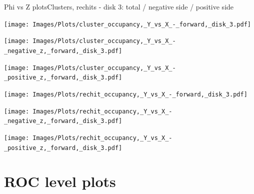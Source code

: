 \documentclass{beamer}
\begin{document}
\begin{frame}{Phi vs Z plots}{Clusters, rechits - disk 3: total / negative side / positive side}
  \hspace{0.01\textwidth}%
  \begin{minipage}{0.32\textwidth}
    \centering
    \texttt{[image: Images/Plots/cluster\_occupancy,\_Y\_vs\_X\_-\_forward,\_disk\_3.pdf]}
  \end{minipage}%
  \hspace{0.01\textwidth}%
  \begin{minipage}{0.32\textwidth}
    \centering
    \texttt{[image: Images/Plots/cluster\_occupancy,\_Y\_vs\_X\_-\_negative\_z,\_forward,\_disk\_3.pdf]}
  \end{minipage}
  \vspace*{0.2cm}
  \begin{minipage}{0.32\textwidth}
    \centering
    \texttt{[image: Images/Plots/cluster\_occupancy,\_Y\_vs\_X\_-\_positive\_z,\_forward,\_disk\_3.pdf]}
  \end{minipage}
  \hspace{0.01\textwidth}%
  \begin{minipage}{0.32\textwidth}
    \centering
    \texttt{[image: Images/Plots/rechit\_occupancy,\_Y\_vs\_X\_-\_forward,\_disk\_3.pdf]}
  \end{minipage}%
  \hspace{0.01\textwidth}%
  \begin{minipage}{0.32\textwidth}
    \centering
    \texttt{[image: Images/Plots/rechit\_occupancy,\_Y\_vs\_X\_-\_negative\_z,\_forward,\_disk\_3.pdf]}
  \end{minipage}
  \vspace*{0.2cm}
  \begin{minipage}{0.32\textwidth}
    \centering
    \texttt{[image: Images/Plots/rechit\_occupancy,\_Y\_vs\_X\_-\_positive\_z,\_forward,\_disk\_3.pdf]}
  \end{minipage}
\end{frame}

\section{ROC level plots}
\end{document}
